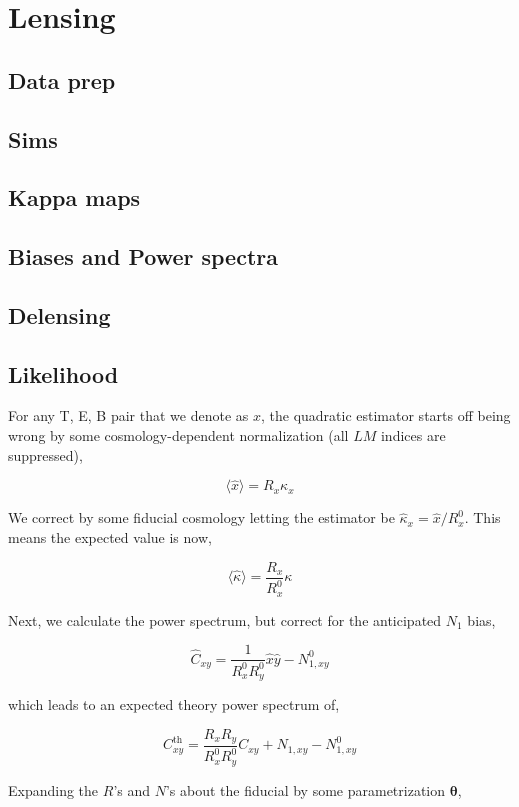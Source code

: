 \documentclass[a4paper, 11pt]{article}
\begin{document}
\section{Lensing}

\subsection{Data prep}
\subsection{Sims}
\subsection{Kappa maps}
\subsection{Biases and Power spectra}
\subsection{Delensing}
\subsection{Likelihood}

For any T, E, B pair that we denote as $x$, the quadratic estimator starts off being wrong by some cosmology-dependent normalization (all $LM$ indices are suppressed),

$$
\langle \hat{x} \rangle = R_{x} \kappa_x 
$$

We correct by some fiducial cosmology letting the estimator be $\hat{\kappa}_x = \hat{x} / R^0_x$. This means the expected value is now,

$$
\langle\hat\kappa\rangle = \frac{R_x}{R^0_x}\kappa 
$$

Next, we calculate the power spectrum, but correct for the anticipated $N_1$ bias,

$$
\hat{C}_{xy}=\frac{1}{R^0_xR^0_y}\hat{x}\hat{y} - N_{1,xy}^0
$$

which leads to an expected theory power spectrum of,

$$
C_{xy}^{\mathrm{th}}=\frac{R_xR_y}{R^0_xR^0_y}C_{xy} + N_{1,xy} - N_{1,xy}^0
$$

Expanding the $R$'s and $N$'s about the fiducial by some parametrization $\boldsymbol{\theta}$,

\newcommand{\bth}{\boldsymbol{\theta}}
\newcommand{\bna}{\boldsymbol{\nabla}}
\end{document}
